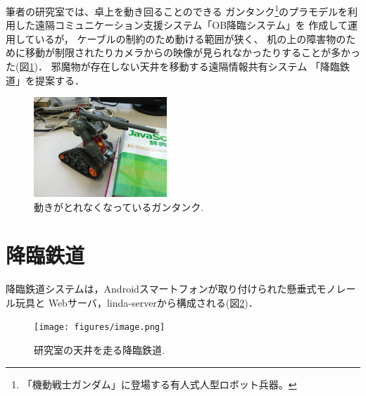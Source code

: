 \documentclass[submit,techreq]{ipsj}
\begin{document}
筆者の研究室では、卓上を動き回ることのできる
ガンタンク\footnote{
  「機動戦士ガンダム」に登場する有人式人型ロボット兵器。
}のプラモデルを利用した遠隔コミュニケーション支援システム「OB降臨システム」を
作成して運用しているが\cite{Hirota:Korin}，
ケーブルの制約のため動ける範囲が狭く、
机の上の障害物のために移動が制限されたりカメラからの映像が見られなかったりすることが多かった(図\ref{guntank})．
%
邪魔物が存在しない天井を移動する遠隔情報共有システム
「降臨鉄道」を提案する．

\begin{figure}[H]
\centerline{\includegraphics[width=50mm]{figures/1e8781bb2a5b28c8e06906d226c7505a.png}}
\caption{動きがとれなくなっているガンタンク.}
\label{guntank}
\end{figure}



% 
% 
% 

\section{降臨鉄道}

降臨鉄道システムは，Androidスマートフォンが取り付けられた懸垂式モノレール玩具と
Webサーバ，linda-server\cite{Shokai:Linda}から構成される(図\ref{monorail})．

\begin{figure}[H]
\begin{center}
\texttt{[image: figures/image.png]}
\end{center}
\caption{研究室の天井を走る降臨鉄道.}
\label{monorail}
\end{figure}
\end{document}
